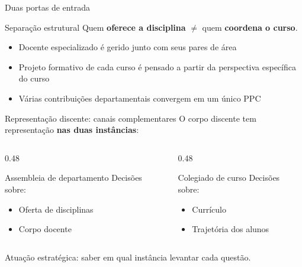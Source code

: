 \documentclass[aspectratio=169]{beamer}
\newcommand{\impt}[1]{\textcolor{maccent}{\textbf{#1}}}
\newcommand{\ntc}[1]{\textcolor{mprimary}{#1}}
\begin{document}
\begin{frame}{Duas portas de entrada}
  \begin{block}{Separação estrutural}
    Quem \impt{oferece a disciplina} $\neq$ quem \impt{coordena o curso}.
  \end{block}

  \vspace{0.4cm}
   
  \begin{itemize}
    \item Docente especializado é gerido junto com seus pares de área
    \item Projeto formativo de cada curso é pensado a partir da perspectiva específica do curso
    \item Várias contribuições departamentais convergem em um único PPC
  \end{itemize}
\end{frame}

\begin{frame}{Representação discente: canais complementares}
  O corpo discente tem representação \impt{nas duas instâncias}:

  \vspace{0.3cm}
  \begin{columns}[T,onlytextwidth]
    \begin{column}{0.48\textwidth}
      \begin{block}{Assembleia de departamento}
        Decisões sobre:
        \begin{itemize}
          \item Oferta de disciplinas
          \item Corpo docente
        \end{itemize}
      \end{block}
    \end{column}
    \begin{column}{0.48\textwidth}
      \begin{block}{Colegiado de curso}
        Decisões sobre:
        \begin{itemize}
          \item Currículo
          \item Trajetória dos alunos
        \end{itemize}
      \end{block}
    \end{column}
  \end{columns}

  \vspace{0.3cm}
   
  \ntc{Atuação estratégica: saber em qual instância levantar cada questão.}
\end{frame}
\end{document}
